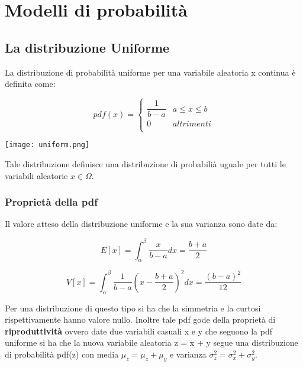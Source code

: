 
\setcounter{chapter}{1}
\chapter{Modelli di probabilit\`{a}}
	
\section{La distribuzione Uniforme}

La distribuzione di probabilit\`{a} uniforme per una variabile aleatoria x continua \`{e} definita come:
\vspace{0.3in}

  \begin{minipage}{.5\textwidth}
    \[ pdf(x) = 
	\begin{cases} 
      \dfrac{1}{b-a} & a \leq x \leq b \\
      0 & altrimenti \\ 
   \end{cases}
\]
  \end{minipage}
  \begin{minipage}{.4\textwidth}
    \centering
    \texttt{[image: uniform.png]}
 	
  \end{minipage}
\vspace{0.3in}

Tale distribuzione definisce una distribuzione di probabili\`{a} uguale per tutti le variabili aleatorie $x \in \Omega$. 

\subsection{Propriet\`{a} della pdf}
Il valore atteso della distribuzione uniforme e la sua varianza sono date da:

\begin{equation}
	E[x] = \int_{\alpha}^{\beta}{\dfrac{x}{b-a}dx} =\dfrac{b+a}{2} 
\end{equation}

\begin{equation}
	V[x] = \int_{\alpha}^{\beta}{\dfrac{1}{b-a}( x- \dfrac{b+a}{2})^2dx} = \dfrac{(b-a)^2}{12}
\end{equation}
\newline

\noindent Per una distribuzione di questo tipo si ha che la simmetria e la curtosi rispettivamente hanno valore nullo.\newline
Inoltre tale pdf gode della propriet\`{a} di \textbf{riproduttivit\`{a}} ovvero date due variabili casuali x e y che seguono la pdf uniforme si ha che la nuova variabile aleatoria z = x + y segue una distribuzione di probabilit\`{a} pdf(z) con media $\mu_z = \mu_z + \mu_y$ e varianza $\sigma^2_z = \sigma_x^2 + \sigma_y^2$.\newline

